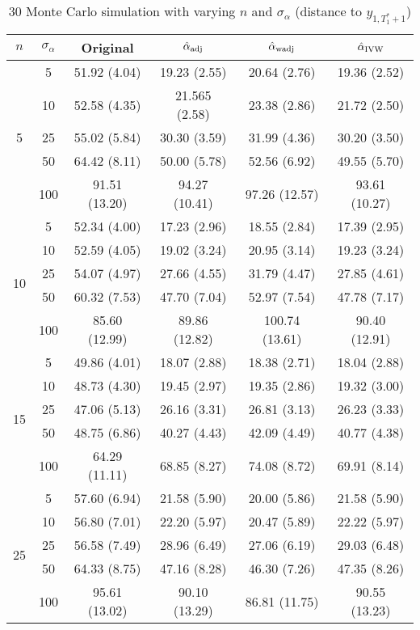 \documentclass[11pt]{article}
\theoremstyle{definition}
\begin{document}
\begin{table}[t]
 \caption{30 Monte Carlo simulation with varying $n$ and $\sigma_{\alpha}$ (distance to $y_{1, T_1^*+1}$)} \label{table3}
 \begin{center}
\begin{tabular}{cc|cccc}
  $n$   & $\sigma_{\alpha}$  & Original & $\hat{\alpha}_{\rm adj}$ & $\hat{\alpha}_{\rm wadj}$ & $\hat{\alpha}_{\rm IVW}$\\[.3cm]  
  \hline
  \multirow{5}{*}{5} & 5  & 51.92 (4.04) & 19.23 (2.55) & 20.64 (2.76) & 19.36 (2.52) \\ 
  & 10  &  52.58 (4.35) & 21.565 (2.58) & 23.38 (2.86) & 21.72 (2.50) \\ 
  & 25  &  55.02 (5.84) & 30.30 (3.59) & 31.99 (4.36) & 30.20 (3.50) \\ 
  & 50  & 64.42 (8.11) & 50.00 (5.78) & 52.56 (6.92) & 49.55 (5.70) \\ 
  & 100  & 91.51 (13.20) & 94.27 (10.41) & 97.26 (12.57) & 93.61 (10.27) \\[.3cm]  
  \multirow{5}{*}{10} & 5 & 52.34 (4.00) & 17.23 (2.96) & 18.55 (2.84) & 17.39 (2.95) \\ 
  & 10 &  52.59 (4.05) & 19.02 (3.24) & 20.95 (3.14) & 19.23 (3.24) \\ 
  & 25 & 54.07 (4.97) & 27.66 (4.55) & 31.79 (4.47) & 27.85 (4.61) \\ 
  & 50 &  60.32 (7.53) & 47.70 (7.04) & 52.97 (7.54) & 47.78 (7.17) \\ 
  & 100 & 85.60 (12.99) & 89.86 (12.82) & 100.74 (13.61) & 90.40 (12.91) \\[.3cm]  
  \multirow{5}{*}{15} & 5 & 49.86 (4.01) & 18.07 (2.88) & 18.38 (2.71) & 18.04 (2.88) \\ 
  & 10 & 48.73 (4.30) & 19.45 (2.97) & 19.35 (2.86) & 19.32 (3.00) \\ 
  & 25 &  47.06 (5.13) & 26.16 (3.31) & 26.81 (3.13) & 26.23 (3.33) \\ 
  & 50 &  48.75 (6.86) & 40.27 (4.43) & 42.09 (4.49) & 40.77 (4.38) \\ 
  & 100 &  64.29 (11.11) & 68.85 (8.27) & 74.08 (8.72) & 69.91 (8.14) \\[.3cm]  
  \multirow{5}{*}{25} & 5 & 57.60 (6.94) & 21.58 (5.90) & 20.00 (5.86) & 21.58 (5.90) \\ 
  & 10 &  56.80 (7.01) & 22.20 (5.97) & 20.47 (5.89) & 22.22 (5.97) \\ 
  & 25 &  56.58 (7.49) & 28.96 (6.49) & 27.06 (6.19) & 29.03 (6.48) \\ 
  & 50 &  64.33 (8.75) & 47.16 (8.28) & 46.30 (7.26) & 47.35 (8.26) \\ 
  & 100 & 95.61 (13.02) & 90.10 (13.29) & 86.81 (11.75) & 90.55 (13.23) \\ 
\end{tabular}	
 \end{center}
 \vspace{-.5cm}
\end{table}
\end{document}
